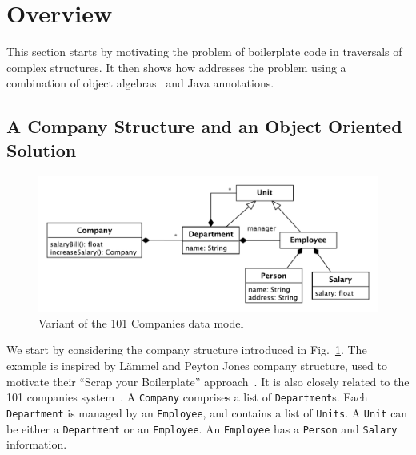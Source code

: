 \section{Overview}\label{subsec:overview}

This section starts by motivating the problem of boilerplate code in
traversals of complex structures. It then shows how \name addresses
the problem using a combination of object algebras~\cite{bruno12oa}
and Java annotations.



\subsection{A Company Structure and an Object Oriented Solution}

\begin{figure}[t]
\centering
\nocaptionrule
\includegraphics[width=0.9\linewidth]{101companies}
\caption{Variant of the 101 Companies data model\label{company_structure}}
\end{figure}

We start by considering the company structure introduced in
Fig.~\ref{company_structure}. The example is inspired by L\"ammel
and Peyton Jones company structure, used to motivate their ``Scrap
your Boilerplate'' approach~\cite{ralf03syb}. It is also closely
related to the 101 companies system~\cite{Inauguration101}.  A
\lstinline{Company} comprises a list of \lstinline{Department}s. Each
\lstinline{Department} is managed by an \lstinline{Employee}, and
contains a list of \lstinline{Units}. A \lstinline{Unit} can be
either a \lstinline{Department} or an \lstinline{Employee}. An
\lstinline{Employee} has a \lstinline{Person} and
\lstinline{Salary} information.

